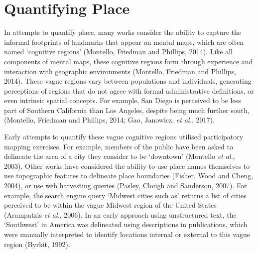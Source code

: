 \documentclass[
  letterpaper,
  11pt,
  english,
  onehalfspacing,
  headsepline]{MastersDoctoralThesis}
\begin{document}
\hypertarget{sec-quant}{%
\section{Quantifying Place}\label{sec-quant}}

In attempts to quantify place, many works consider the ability to
capture the informal footprints of landmarks that appear on mental maps,
which are often named `cognitive regions' (Montello, Friedman and
Phillips, 2014). Like all components of mental maps, these cognitive
regions form through experience and interaction with geographic
environments (Montello, Friedman and Phillips, 2014). These vague
regions vary between populations and individuals, generating perceptions
of regions that do not agree with formal administrative definitions, or
even intrinsic spatial concepts. For example, San Diego is perceived to
be less part of Southern California than Los Angeles, despite being much
further south, (Montello, Friedman and Phillips, 2014; Gao, Janowicz,
\emph{et al.}, 2017).

Early attempts to quantify these vague cognitive regions utilised
participatory mapping exercises. For example, members of the public have
been asked to delineate the area of a city they consider to be
`downtown' (Montello \emph{et al.}, 2003). Other works have considered
the ability to use place names themselves to use topographic features to
delineate place boundaries (Fisher, Wood and Cheng, 2004), or use web
harvesting queries (Pasley, Clough and Sanderson, 2007). For example,
the search engine query `Midwest cities such as' returns a list of
cities perceived to be within the vague Midwest region of the United
States (Arampatzis \emph{et al.}, 2006). In an early approach using
unstructured text, the `Southwest' in America was delineated using
descriptions in publications, which were manually interpreted to
identify locations internal or external to this vague region (Byrkit,
1992).
\end{document}
